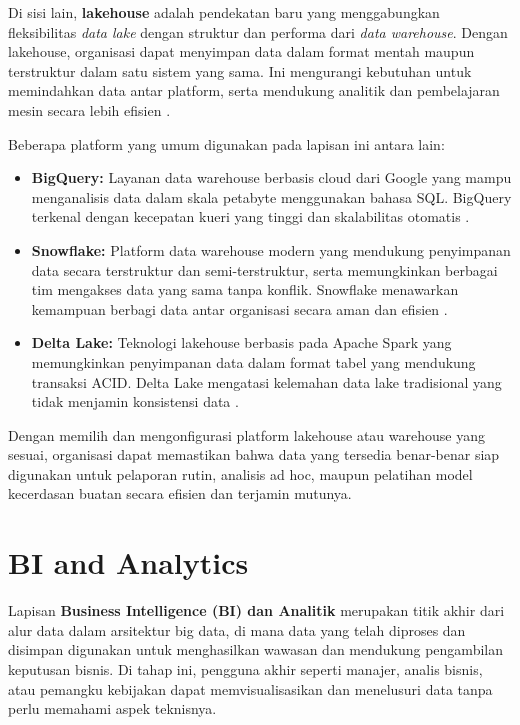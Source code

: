 Di sisi lain, \textbf{lakehouse} adalah pendekatan baru yang menggabungkan fleksibilitas \textit{data lake} dengan struktur dan performa dari \textit{data warehouse}. Dengan lakehouse, organisasi dapat menyimpan data dalam format mentah maupun terstruktur dalam satu sistem yang sama. Ini mengurangi kebutuhan untuk memindahkan data antar platform, serta mendukung analitik dan pembelajaran mesin secara lebih efisien \cite{armbrust2021lakehouse}.

Beberapa platform yang umum digunakan pada lapisan ini antara lain:

\begin{itemize}
	\item \textbf{BigQuery:} Layanan data warehouse berbasis cloud dari Google yang mampu menganalisis data dalam skala petabyte menggunakan bahasa SQL. BigQuery terkenal dengan kecepatan kueri yang tinggi dan skalabilitas otomatis \cite{googlebigquerydocs}.
	
	\item \textbf{Snowflake:} Platform data warehouse modern yang mendukung penyimpanan data secara terstruktur dan semi-terstruktur, serta memungkinkan berbagai tim mengakses data yang sama tanpa konflik. Snowflake menawarkan kemampuan berbagi data antar organisasi secara aman dan efisien \cite{frost2020snowflake}.
	
	\item \textbf{Delta Lake:} Teknologi lakehouse berbasis pada Apache Spark yang memungkinkan penyimpanan data dalam format tabel yang mendukung transaksi ACID. Delta Lake mengatasi kelemahan data lake tradisional yang tidak menjamin konsistensi data \cite{armbrust2020delta}.
\end{itemize}

Dengan memilih dan mengonfigurasi platform lakehouse atau warehouse yang sesuai, organisasi dapat memastikan bahwa data yang tersedia benar-benar siap digunakan untuk pelaporan rutin, analisis ad hoc, maupun pelatihan model kecerdasan buatan secara efisien dan terjamin mutunya.

\section{BI and Analytics}

Lapisan \textbf{Business Intelligence (BI) dan Analitik} merupakan titik akhir dari alur data dalam arsitektur big data, di mana data yang telah diproses dan disimpan digunakan untuk menghasilkan wawasan dan mendukung pengambilan keputusan bisnis. Di tahap ini, pengguna akhir seperti manajer, analis bisnis, atau pemangku kebijakan dapat memvisualisasikan dan menelusuri data tanpa perlu memahami aspek teknisnya.

